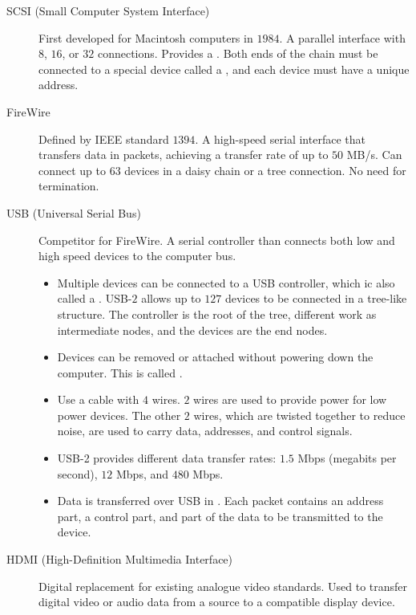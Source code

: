 \documentclass[\main/notes.tex]{subfiles}
\begin{document}
					\begin{indentparagraph}
						\begin{description}
							\item[SCSI (Small Computer System Interface)] First developed for Macintosh computers in $1984$. A parallel interface with $8$, $16$, or $32$ connections. Provides a . Both ends of the chain must be connected to a special device called a , and each device must have a unique address.
							\item[FireWire] Defined by IEEE standard $1394$. A high-speed serial interface that transfers data in packets, achieving a transfer rate of up to $50$ MB/s. Can connect up to $63$ devices in a daisy chain or a tree connection. No need for termination.
							\item[USB (Universal Serial Bus)] Competitor for FireWire. A serial controller than connects both low and high speed devices to the computer bus.
								\begin{itemize}
									\item Multiple devices can be connected to a USB controller, which ic also called a . USB-$2$ allows up to $127$ devices to be connected in a tree-like structure. The controller is the root of the tree, different  work as intermediate nodes, and the devices are the end nodes.
									\item Devices can be removed or attached without powering down the computer. This is called .
									\item Use a cable with $4$ wires. $2$ wires are used to provide power for low power devices. The other $2$ wires, which are twisted together to reduce noise, are used to carry data, addresses, and control signals.
									\item USB-2 provides different data transfer rates: $1.5$ Mbps (megabits per second), $12$ Mbps, and $480$ Mbps.
									\item Data is transferred over USB in . Each packet contains an address part, a control part, and part of the data to be transmitted to the device.
								\end{itemize}
							\item[HDMI (High-Definition Multimedia Interface)] Digital replacement for existing analogue video standards. Used to transfer digital video or audio data from a source to a compatible display device.
						\end{description}
					\end{indentparagraph}
\end{document}
